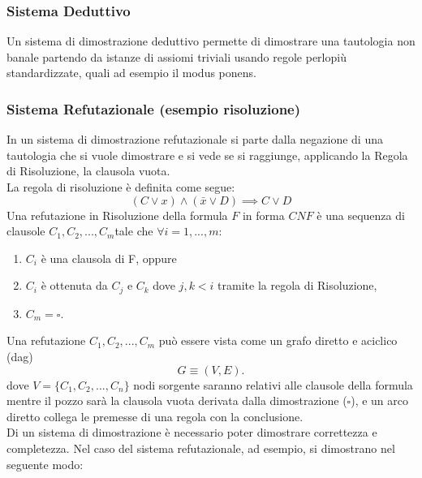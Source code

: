 \documentclass[it]{article}
\begin{document}
        \subsubsection{Sistema Deduttivo}
        Un sistema di dimostrazione deduttivo permette di dimostrare una tautologia non banale partendo da istanze di assiomi triviali usando regole perlopiù standardizzate, quali ad esempio il modus ponens.
        \subsubsection{Sistema Refutazionale (esempio risoluzione)}
        In un sistema di dimostrazione refutazionale si parte dalla negazione di una tautologia che si vuole dimostrare e si vede se si raggiunge, applicando la Regola di Risoluzione, la clausola vuota.\\
        La regola di risoluzione è definita come segue: 
        $$ (C \lor x) \land (\bar{x} \lor D)\implies C \lor D $$
        Una refutazione in Risoluzione della formula $ {\displaystyle F} $ in forma $ {\displaystyle CNF} $ è una sequenza di clausole $C_{1}, C_{2}, ..., C_{m} $tale che $\forall i = 1, ..., m$:\\
        \begin{enumerate}
            \item $C_{i}$ è una clausola di F, oppure
            \item $C_{i}$ è ottenuta da $C_{j}$ e $C_{k}$ dove $j, k < i$ tramite la regola di Risoluzione,
            \item $C_{m} = \square$.
        \end{enumerate}
        Una refutazione ${C_{1}, C_{2}, ..., C_{m}}$ può essere vista come un grafo diretto e aciclico (dag) 
        $$ G \equiv (V, E).$$
        dove $V = \{C_{1}, C_{2}, ..., C_{n}\}$ nodi sorgente saranno relativi alle clausole della formula mentre il pozzo sarà la clausola vuota derivata dalla dimostrazione ($\square$), e un arco diretto collega le premesse di una regola con la conclusione.\\
        Di un sistema di dimostrazione è necessario poter dimostrare correttezza e completezza. Nel caso del sistema refutazionale, ad esempio, si dimostrano nel seguente modo:
\end{document}
